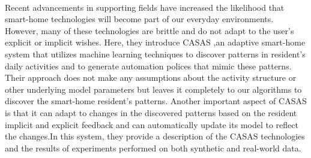 \begin{enumerate}
			\paragraph{}Recent advancements in supporting fields have increased the likelihood that smart-home technologies will become part of our everyday environments. However, many of these technologies are brittle and do not adapt to the user’s explicit or implicit wishes. Here, they introduce CASAS ,an adaptive smart-home system that utilizes machine learning techniques to discover patterns in resident’s daily activities and to generate automation polices that mimic these patterns. Their approach does not make any assumptions about the activity structure or other underlying model parameters but leaves it completely to our algorithms to discover the smart-home resident’s patterns. Another important aspect of CASAS is that it can adapt to changes in the discovered patterns based on the resident implicit and explicit feedback and can automatically update its model to reflect the changes.In this system, they provide a description of the CASAS technologies and the results of experiments performed on both synthetic and real-world data.\\

\end{enumerate}